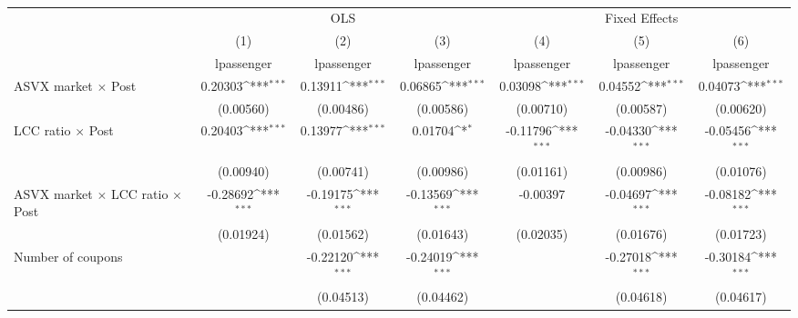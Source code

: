 \begin{table}[htbp]\centering
\def\sym#1{\ifmmode^{#1}\else\(^{#1}\)\fi}
\caption{ \label{post4passenger}}
\begin{tabular}{l*{6}{c}}
\toprule
                    &\multicolumn{3}{c}{OLS}                                          &\multicolumn{3}{c}{Fixed Effects}                                \\\cmidrule(lr){2-4}\cmidrule(lr){5-7}
                    &\multicolumn{1}{c}{(1)}&\multicolumn{1}{c}{(2)}&\multicolumn{1}{c}{(3)}&\multicolumn{1}{c}{(4)}&\multicolumn{1}{c}{(5)}&\multicolumn{1}{c}{(6)}\\
                    &\multicolumn{1}{c}{lpassenger}&\multicolumn{1}{c}{lpassenger}&\multicolumn{1}{c}{lpassenger}&\multicolumn{1}{c}{lpassenger}&\multicolumn{1}{c}{lpassenger}&\multicolumn{1}{c}{lpassenger}\\
\midrule
ASVX market $\times$ Post&     0.20303\sym{***}&     0.13911\sym{***}&     0.06865\sym{***}&     0.03098\sym{***}&     0.04552\sym{***}&     0.04073\sym{***}\\
                    &   (0.00560)         &   (0.00486)         &   (0.00586)         &   (0.00710)         &   (0.00587)         &   (0.00620)         \\
\addlinespace
LCC ratio $\times$ Post&     0.20403\sym{***}&     0.13977\sym{***}&     0.01704\sym{*}  &    -0.11796\sym{***}&    -0.04330\sym{***}&    -0.05456\sym{***}\\
                    &   (0.00940)         &   (0.00741)         &   (0.00986)         &   (0.01161)         &   (0.00986)         &   (0.01076)         \\
\addlinespace
ASVX market $\times$ LCC ratio $\times$ Post&    -0.28692\sym{***}&    -0.19175\sym{***}&    -0.13569\sym{***}&    -0.00397         &    -0.04697\sym{***}&    -0.08182\sym{***}\\
                    &   (0.01924)         &   (0.01562)         &   (0.01643)         &   (0.02035)         &   (0.01676)         &   (0.01723)         \\
\addlinespace
Number of coupons   &                     &    -0.22120\sym{***}&    -0.24019\sym{***}&                     &    -0.27018\sym{***}&    -0.30184\sym{***}\\
                    &                     &   (0.04513)         &   (0.04462)         &                     &   (0.04618)         &   (0.04617)         \\

\end{tabular}
\end{table}
